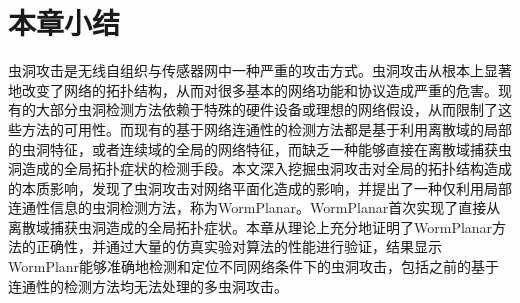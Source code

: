 \section{本章小结}
虫洞攻击是无线自组织与传感器网中一种严重的攻击方式。虫洞攻击从根本上显著地改变了网络的拓扑结构，从而对很多基本的网络功能和协议造成严重的危害。现有的大部分虫洞检测方法依赖于特殊的硬件设备或理想的网络假设，从而限制了这些方法的可用性。而现有的基于网络连通性的检测方法都是基于利用离散域的局部的虫洞特征，或者连续域的全局的网络特征，而缺乏一种能够直接在离散域捕获虫洞造成的全局拓扑症状的检测手段。本文深入挖掘虫洞攻击对全局的拓扑结构造成的本质影响，发现了虫洞攻击对网络平面化造成的影响，并提出了一种仅利用局部连通性信息的虫洞检测方法，称为WormPlanar。WormPlanar首次实现了直接从离散域捕获虫洞造成的全局拓扑症状。本章从理论上充分地证明了WormPlanar方法的正确性，并通过大量的仿真实验对算法的性能进行验证，结果显示WormPlanr能够准确地检测和定位不同网络条件下的虫洞攻击，包括之前的基于连通性的检测方法均无法处理的多虫洞攻击。
